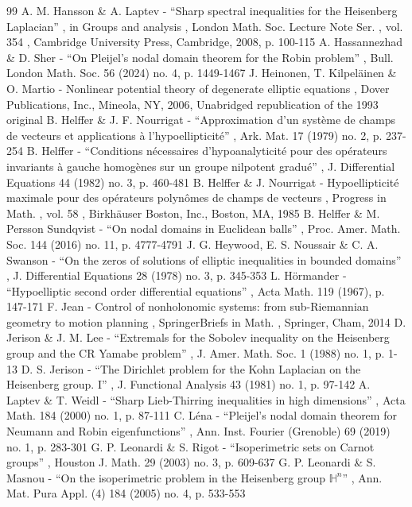 \documentclass[11pt]{article}
\theoremstyle{definition}
\newcommand{\1}{\mathbbm{1}}
\numberwithin{equation}{section}
\begin{document}
\begin{thebibliography}{99}
 A. M. Hansson \& A. Laptev - “Sharp spectral inequalities for the Heisenberg Laplacian” , in Groups and analysis , London Math. Soc. Lecture Note Ser. , vol. 354 , Cambridge University Press, Cambridge, 2008, p. 100-115
 A. Hassannezhad \& D. Sher - “On Pleijel’s nodal domain theorem for the Robin problem” , Bull. London Math. Soc. 56 (2024) no. 4, p. 1449-1467
 J. Heinonen, T. Kilpeläinen \& O. Martio - Nonlinear potential theory of degenerate elliptic equations , Dover Publications, Inc., Mineola, NY, 2006, Unabridged republication of the 1993 original
 B. Helffer \& J. F. Nourrigat - “Approximation d’un système de champs de vecteurs et applications à l’hypoellipticité” , Ark. Mat. 17 (1979) no. 2, p. 237-254
 B. Helffer - “Conditions nécessaires d’hypoanalyticité pour des opérateurs invariants à gauche homogènes sur un groupe nilpotent gradué” , J. Differential Equations 44 (1982) no. 3, p. 460-481
 B. Helffer \& J. Nourrigat - Hypoellipticité maximale pour des opérateurs polynômes de champs de vecteurs , Progress in Math. , vol. 58 , Birkhäuser Boston, Inc., Boston, MA, 1985
 B. Helffer \& M. Persson Sundqvist - “On nodal domains in Euclidean balls” , Proc. Amer. Math. Soc. 144 (2016) no. 11, p. 4777-4791
 J. G. Heywood, E. S. Noussair \& C. A. Swanson - “On the zeros of solutions of elliptic inequalities in bounded domains” , J. Differential Equations 28 (1978) no. 3, p. 345-353
 L. Hörmander - “Hypoelliptic second order differential equations” , Acta Math. 119 (1967), p. 147-171
 F. Jean - Control of nonholonomic systems: from sub-Riemannian geometry to motion planning , SpringerBriefs in Math. , Springer, Cham, 2014
 D. Jerison \& J. M. Lee - “Extremals for the Sobolev inequality on the Heisenberg group and the CR Yamabe problem” , J. Amer. Math. Soc. 1 (1988) no. 1, p. 1-13
 D. S. Jerison - “The Dirichlet problem for the Kohn Laplacian on the Heisenberg group. I” , J. Functional Analysis 43 (1981) no. 1, p. 97-142
 A. Laptev \& T. Weidl - “Sharp Lieb-Thirring inequalities in high dimensions” , Acta Math. 184 (2000) no. 1, p. 87-111
 C. Léna - “Pleijel’s nodal domain theorem for Neumann and Robin eigenfunctions” , Ann. Inst. Fourier (Grenoble) 69 (2019) no. 1, p. 283-301
 G. P. Leonardi \& S. Rigot - “Isoperimetric sets on Carnot groups” , Houston J. Math. 29 (2003) no. 3, p. 609-637
 G. P. Leonardi \& S. Masnou - “On the isoperimetric problem in the Heisenberg group ${\mathbb{H}}^n$” , Ann. Mat. Pura Appl. (4) 184 (2005) no. 4, p. 533-553

\end{thebibliography}
\end{document}
